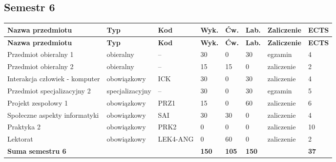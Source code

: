 \documentclass[12pt,a4paper]{article}
\newcommand{\thdrule}{\noalign{\global\setlength{\extrarowheight}{0pt}}}
\newcommand{\thdend}{\noalign{\global\setlength{\extrarowheight}{4pt}}}
\begin{document}
\subsection*{Semestr 6}

{\scriptsize
\begin{longtable}{>{\RaggedRight}m{5.0cm}m{1.9cm}m{0.75cm}m{0.85cm}m{0.85cm}m{0.85cm}m{1.45cm}m{0.9cm}}
\thdrule\toprule
\rowcolor{pjatkRed}
{\color{white}\footnotesize\textbf{\vphantom{Ag}Nazwa przedmiotu}} & {\color{white}\footnotesize\textbf{\vphantom{Ag}Typ}} & {\color{white}\footnotesize\textbf{\vphantom{Ag}Kod}} & {\color{white}\footnotesize\textbf{\vphantom{Ag}Wyk.}} & {\color{white}\footnotesize\textbf{\vphantom{Ag}Ćw.}} & {\color{white}\footnotesize\textbf{\vphantom{Ag}Lab.}} & {\color{white}\footnotesize\textbf{\vphantom{Ag}Zaliczenie}} & {\color{white}\footnotesize\textbf{\vphantom{Ag}ECTS}} \\
\midrule\thdend
\endfirsthead
\thdrule\toprule
\rowcolor{pjatkRed}
{\color{white}\footnotesize\textbf{\vphantom{Ag}Nazwa przedmiotu}} & {\color{white}\footnotesize\textbf{\vphantom{Ag}Typ}} & {\color{white}\footnotesize\textbf{\vphantom{Ag}Kod}} & {\color{white}\footnotesize\textbf{\vphantom{Ag}Wyk.}} & {\color{white}\footnotesize\textbf{\vphantom{Ag}Ćw.}} & {\color{white}\footnotesize\textbf{\vphantom{Ag}Lab.}} & {\color{white}\footnotesize\textbf{\vphantom{Ag}Zaliczenie}} & {\color{white}\footnotesize\textbf{\vphantom{Ag}ECTS}} \\
\midrule\thdend
\endhead
\rowcolor{tableElective} Przedmiot obieralny 1 & {\scriptsize obieralny} & -- & 30 & 0 & 30 & {\scriptsize egzamin} & 4 \\
\rowcolor{tableElective} Przedmiot obieralny 2 & {\scriptsize obieralny} & -- & 15 & 15 & 0 & {\scriptsize zaliczenie} & 2 \\
\rowcolor{tableRowLight} Interakcja człowiek - komputer & {\scriptsize obowiązkowy} & ICK & 30 & 0 & 30 & {\scriptsize zaliczenie} & 4 \\
\rowcolor{tableElective} Przedmiot specjalizacyjny 2 & {\scriptsize specjalizacyjny} & -- & 30 & 0 & 30 & {\scriptsize egzamin} & 5 \\
\rowcolor{tableRowLight} Projekt zespołowy 1 & {\scriptsize obowiązkowy} & PRZ1 & 15 & 0 & 60 & {\scriptsize zaliczenie} & 6 \\
\rowcolor{tableRowAlt} Społeczne aspekty informatyki & {\scriptsize obowiązkowy} & SAI & 30 & 30 & 0 & {\scriptsize zaliczenie} & 4 \\
\rowcolor{tableRowLight} Praktyka 2 & {\scriptsize obowiązkowy} & PRK2 & 0 & 0 & 0 & {\scriptsize zaliczenie} & 10 \\
\rowcolor{tableRowAlt} Lektorat & {\scriptsize obowiązkowy} & LEK4-ANG & 0 & 60 & 0 & {\scriptsize zaliczenie} & 2 \\
\midrule[\heavyrulewidth]
\rowcolor{tableSummary} \textbf{Suma semestru 6} & & & \textbf{150} & \textbf{105} & \textbf{150} & & \textbf{37} \\
\bottomrule
\end{longtable}}
\end{document}
